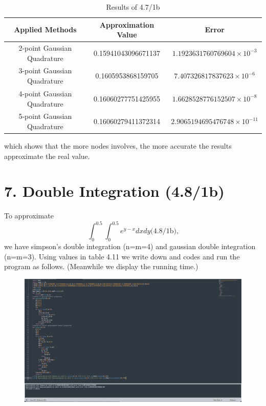 \documentclass{article}
\begin{document}
    \begin{table}[htbp]
    \centering
    \caption{Results of 4.7/1b}
    \begin{tabular}{c|c|c}
    \toprule
    \textbf{Applied Methods} & \textbf{Approximation Value } & \textbf{Error}\\ 
    \midrule
    2-point Gaussian Quadrature & 0.15941043096671137 &$1.1923631760769604\times 10^{-3}$ \\
    3-point Gaussian Quadrature & 0.1605953868159705 &$7.407326817837623\times 10^{-6}$\\
    4-point Gaussian Quadrature &  0.16060277751425955 &$1.6628528776152507\times 10^{-8}$\\ 
    5-point Gaussian Quadrature &  0.16060279411372314  &$2.9065194695476748\times 10^{-11}$\\ 
    \bottomrule
    \end{tabular}
    \end{table}

    which shows that the more nodes involves, the more accurate the results approximate the real value.

\section{7. Double Integration (4.8/1b)}
    To approximate 
    $$\int_{0}^{0.5}\int_{0}^{0.5}e^{y-x}dxdy \text{(4.8/1b),}$$ 
    we have simpson's double integration (n=m=4) and gaussian double integration (n=m=3). Using values in table 4.11 we write down and codes and run the program as follows. (Meanwhile we display the running time.)

    \begin{figure}[h]
    \centering
    \includegraphics[scale=0.3]{Program5}
    \end{figure}
\end{document}

